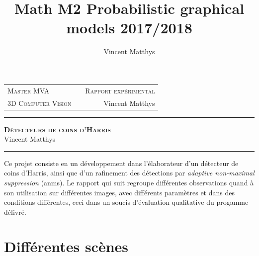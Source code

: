 \documentclass[12pt,a4paper,onecolumn]{article}
\title{Math M2 Probabilistic graphical models 2017/2018}
\author{Vincent Matthys}
\begin{document}
\begin{tabularx}{0.8\textwidth}{@{} l X r @{} }
	{\textsc{Master MVA}}       &  & \textsc{Rapport expérimental} \\
	\textsc{3D Computer Vision} &  & {Vincent Matthys}             \\
\end{tabularx}
\vspace{1.5cm}
\begin{center}
	\rule[11pt]{5cm}{0.5pt}

	\textbf{\LARGE \textsc{Détecteurs de coins d'Harris}}
	\vspace{0.5cm}\\
	Vincent Matthys\\
	\rule{5cm}{0.5pt}
	\vspace{1.5cm}
\end{center}

Ce projet consiste en un développement dans l'élaborateur d'un détecteur de coins d'Harris, ainsi que d'un rafinement des détections par \textit{adaptive non-maximal suppression} (anms). Le rapport qui suit regroupe différentes observations quand à son utilisation sur différentes images, avec différents paramètres et dans des conditions différentes, ceci dans un soucis d'évaluation qualitative du progamme délivré.

\tableofcontents
\section{Différentes scènes}
\end{document}
